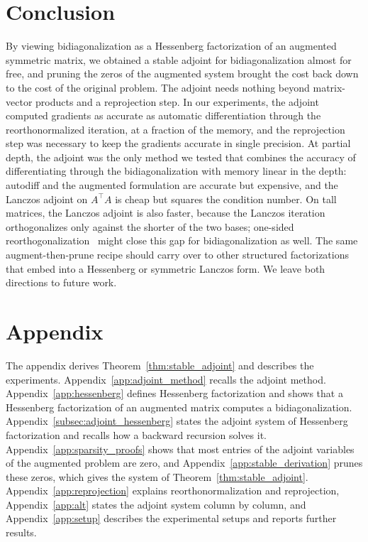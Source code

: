\documentclass[a4paper,12pt]{article}
\theoremstyle{definition}
\begin{document}
\FloatBarrier
\section{Conclusion}
By viewing bidiagonalization as a Hessenberg factorization of an augmented symmetric matrix, we obtained a stable adjoint for bidiagonalization almost for free, and pruning the zeros of the augmented system brought the cost back down to the cost of the original problem. The adjoint needs nothing beyond matrix-vector products and a reprojection step. In our experiments, the adjoint computed gradients as accurate as automatic differentiation through the reorthonormalized iteration, at a fraction of the memory, and the reprojection step was necessary to keep the gradients accurate in single precision. At partial depth, the adjoint was the only method we tested that combines the accuracy of differentiating through the bidiagonalization with memory linear in the depth: autodiff and the augmented formulation are accurate but expensive, and the Lanczos adjoint on $A^\top A$ is cheap but squares the condition number. On tall matrices, the Lanczos adjoint is also faster, because the Lanczos iteration orthogonalizes only against the shorter of the two bases; one-sided reorthogonalization~\citep{simon2000low} might close this gap for bidiagonalization as well. The same augment-then-prune recipe should carry over to other structured factorizations that embed into a Hessenberg or symmetric Lanczos form. We leave both directions to future work.




\clearpage
\appendix
\section*{Appendix}
The appendix derives Theorem~\ref{thm:stable_adjoint} and describes the experiments. Appendix~\ref{app:adjoint_method} recalls the adjoint method. Appendix~\ref{app:hessenberg} defines Hessenberg factorization and shows that a Hessenberg factorization of an augmented matrix computes a bidiagonalization. Appendix~\ref{subsec:adjoint_hessenberg} states the adjoint system of Hessenberg factorization and recalls how a backward recursion solves it. Appendix~\ref{app:sparsity_proofs} shows that most entries of the adjoint variables of the augmented problem are zero, and Appendix~\ref{app:stable_derivation} prunes these zeros, which gives the system of Theorem~\ref{thm:stable_adjoint}. Appendix~\ref{app:reprojection} explains reorthonormalization and reprojection, Appendix~\ref{app:alt} states the adjoint system column by column, and Appendix~\ref{app:setup} describes the experimental setups and reports further results.
\end{document}
